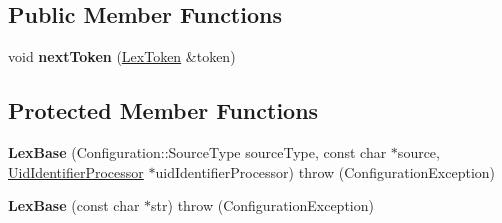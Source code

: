 \subsection*{Public Member Functions}
\begin{DoxyCompactItemize}
\item 
\hypertarget{classCONFIG4CPP__NAMESPACE_1_1LexBase_ac22c286e98a298acb77cf649e9fc7c07}{void {\bfseries next\-Token} (\hyperlink{classCONFIG4CPP__NAMESPACE_1_1LexToken}{Lex\-Token} \&token)}\label{classCONFIG4CPP__NAMESPACE_1_1LexBase_ac22c286e98a298acb77cf649e9fc7c07}

\end{DoxyCompactItemize}
\subsection*{Protected Member Functions}
\begin{DoxyCompactItemize}
\item 
\hypertarget{classCONFIG4CPP__NAMESPACE_1_1LexBase_a6105dd05de2a9c510496b9f42b23e238}{{\bfseries Lex\-Base} (Configuration\-::\-Source\-Type source\-Type, const char $\ast$source, \hyperlink{classCONFIG4CPP__NAMESPACE_1_1UidIdentifierProcessor}{Uid\-Identifier\-Processor} $\ast$uid\-Identifier\-Processor)  throw (\-Configuration\-Exception)}\label{classCONFIG4CPP__NAMESPACE_1_1LexBase_a6105dd05de2a9c510496b9f42b23e238}

\item 
\hypertarget{classCONFIG4CPP__NAMESPACE_1_1LexBase_aea73aeb02d65ce8086297f871d0c6865}{{\bfseries Lex\-Base} (const char $\ast$str)  throw (\-Configuration\-Exception)}\label{classCONFIG4CPP__NAMESPACE_1_1LexBase_aea73aeb02d65ce8086297f871d0c6865}

\end{DoxyCompactItemize}
